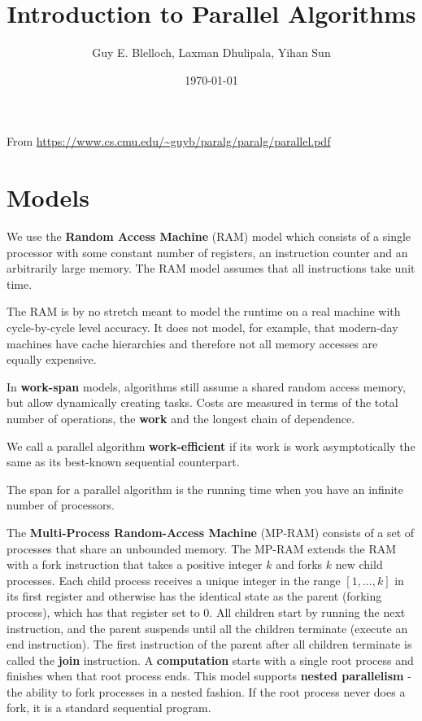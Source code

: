 \documentclass[11pt]{article}
\author{Guy E. Blelloch, Laxman Dhulipala, Yihan Sun}
\date{\today}
\title{Introduction to Parallel Algorithms}
\begin{document}
\maketitle
\tableofcontents

From \url{https://www.cs.cmu.edu/\~guyb/paralg/paralg/parallel.pdf}
\section{Models}
\label{sec:orgf6aa965}
We use the \textbf{Random Access Machine} (RAM) model which consists of a single processor with some constant
number of registers, an instruction counter and an arbitrarily large memory. The RAM model assumes
that all instructions take unit time.

The RAM is by no stretch meant to model the runtime on a real machine with cycle-by-cycle level
accuracy. It does not model, for example, that modern-day machines have cache hierarchies and
therefore not all memory accesses are equally expensive.

In \textbf{work-span} models, algorithms still assume a shared random access memory, but allow dynamically
creating tasks. Costs are measured in terms of the total number of operations, the \textbf{work} and the
longest chain of dependence.

We call a parallel algorithm \textbf{work-efficient} if its work is work asymptotically the same as its
best-known sequential counterpart.

The span for a parallel algorithm is the running time when you have an infinite number of processors.

The \textbf{Multi-Process Random-Access Machine} (MP-RAM) consists of a set of processes that share an
unbounded memory. The MP-RAM extends the RAM with a fork instruction that takes a positive integer
\(k\) and forks \(k\) new child processes. Each child process receives a unique integer in the range
\([1, . . . , k]\) in its first register and otherwise has the identical state as the parent (forking
process), which has that register set to 0. All children start by running the next instruction, and
the parent suspends until all the children terminate (execute an end instruction). The first
instruction of the parent after all children terminate is called the \textbf{join} instruction. A \textbf{computation}
starts with a single root process and finishes when that root process ends. This model supports
\textbf{nested parallelism} -the ability to fork processes in a nested fashion. If the root process never does
a fork, it is a standard sequential program.
\end{document}
